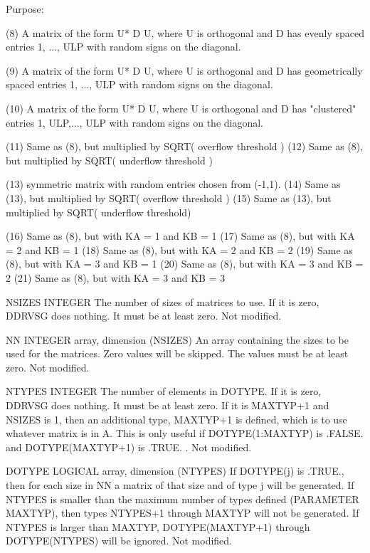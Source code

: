 \begin{DoxyParagraph}{Purpose\+: }
\begin{DoxyVerb}
      (8)  A matrix of the form  U* D U, where U is orthogonal and
           D has evenly spaced entries 1, ..., ULP with random signs
           on the diagonal.

      (9)  A matrix of the form  U* D U, where U is orthogonal and
           D has geometrically spaced entries 1, ..., ULP with random
           signs on the diagonal.

      (10) A matrix of the form  U* D U, where U is orthogonal and
           D has "clustered" entries 1, ULP,..., ULP with random
           signs on the diagonal.

      (11) Same as (8), but multiplied by SQRT( overflow threshold )
      (12) Same as (8), but multiplied by SQRT( underflow threshold )

      (13) symmetric matrix with random entries chosen from (-1,1).
      (14) Same as (13), but multiplied by SQRT( overflow threshold )
      (15) Same as (13), but multiplied by SQRT( underflow threshold)

      (16) Same as (8), but with KA = 1 and KB = 1
      (17) Same as (8), but with KA = 2 and KB = 1
      (18) Same as (8), but with KA = 2 and KB = 2
      (19) Same as (8), but with KA = 3 and KB = 1
      (20) Same as (8), but with KA = 3 and KB = 2
      (21) Same as (8), but with KA = 3 and KB = 3\end{DoxyVerb}
 \begin{DoxyVerb}  NSIZES  INTEGER
          The number of sizes of matrices to use.  If it is zero,
          DDRVSG does nothing.  It must be at least zero.
          Not modified.

  NN      INTEGER array, dimension (NSIZES)
          An array containing the sizes to be used for the matrices.
          Zero values will be skipped.  The values must be at least
          zero.
          Not modified.

  NTYPES  INTEGER
          The number of elements in DOTYPE.   If it is zero, DDRVSG
          does nothing.  It must be at least zero.  If it is MAXTYP+1
          and NSIZES is 1, then an additional type, MAXTYP+1 is
          defined, which is to use whatever matrix is in A.  This
          is only useful if DOTYPE(1:MAXTYP) is .FALSE. and
          DOTYPE(MAXTYP+1) is .TRUE. .
          Not modified.

  DOTYPE  LOGICAL array, dimension (NTYPES)
          If DOTYPE(j) is .TRUE., then for each size in NN a
          matrix of that size and of type j will be generated.
          If NTYPES is smaller than the maximum number of types
          defined (PARAMETER MAXTYP), then types NTYPES+1 through
          MAXTYP will not be generated.  If NTYPES is larger
          than MAXTYP, DOTYPE(MAXTYP+1) through DOTYPE(NTYPES)
          will be ignored.
          Not modified.


\end{DoxyVerb}
\end{DoxyParagraph}

